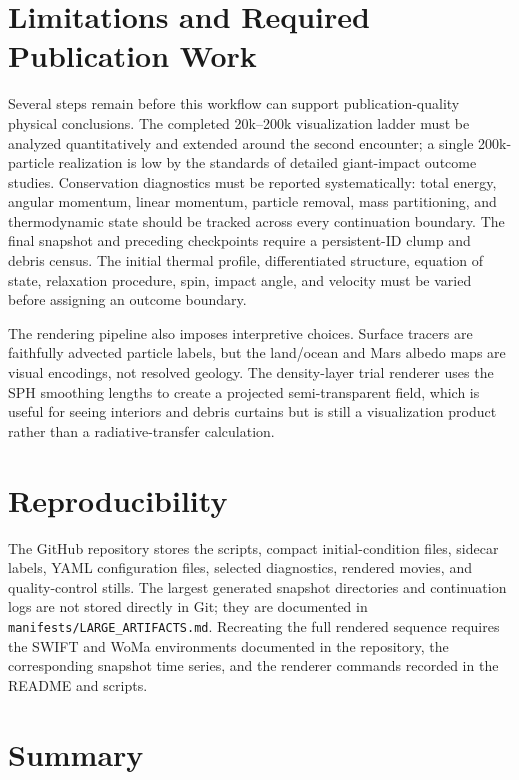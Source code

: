 \documentclass[twocolumn]{aastex631}
\begin{document}
\section{Limitations and Required Publication Work}

Several steps remain before this workflow can support publication-quality
physical conclusions.  The completed 20k--200k visualization ladder must be
analyzed quantitatively and extended around the second encounter; a single
200k-particle realization is low by the standards of detailed giant-impact
outcome studies.  Conservation diagnostics must be reported systematically:
total energy, angular momentum, linear momentum, particle removal, mass
partitioning, and thermodynamic state should be tracked across every continuation
boundary.  The final snapshot and preceding checkpoints require a persistent-ID
clump and debris census.  The initial thermal profile, differentiated structure,
equation of state, relaxation procedure, spin, impact angle, and velocity must be
varied before assigning an outcome boundary.

The rendering pipeline also imposes interpretive choices.  Surface tracers are
faithfully advected particle labels, but the land/ocean and Mars albedo maps
are visual encodings, not resolved geology.  The density-layer trial renderer
uses the SPH smoothing lengths to create a projected semi-transparent field,
which is useful for seeing interiors and debris curtains but is still a
visualization product rather than a radiative-transfer calculation.

\section{Reproducibility}

The GitHub repository stores the scripts, compact initial-condition files,
sidecar labels, YAML configuration files, selected diagnostics, rendered movies,
and quality-control stills.  The largest generated snapshot directories and
continuation logs are not stored directly in Git; they are documented in
\texttt{manifests/LARGE\_ARTIFACTS.md}.  Recreating the full rendered sequence
requires the SWIFT and WoMa environments documented in the repository, the
corresponding snapshot time series, and the renderer commands recorded in the
README and scripts.

\section{Summary}
\end{document}
